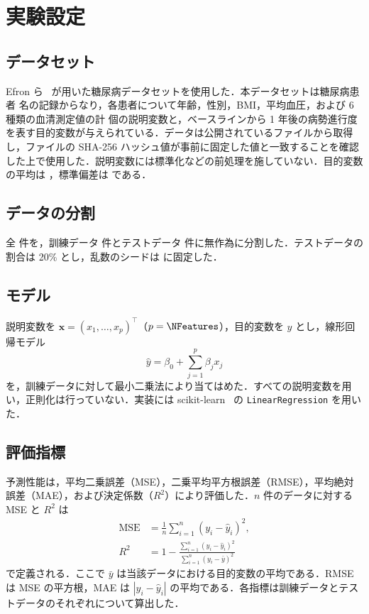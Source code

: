 \documentclass[9pt,a4paper,twocolumn]{ltjsarticle}
\begin{document}

\section{実験設定}

\subsection{データセット}
Efron ら~\cite{efron2004} が用いた糖尿病データセットを使用した．本データセットは糖尿病患者 \NSamples{} 名の記録からなり，各患者について年齢，性別，BMI，平均血圧，および 6 種類の血清測定値の計 \NFeatures{} 個の説明変数と，ベースラインから 1 年後の病勢進行度を表す目的変数が与えられている．データは公開されているファイルから取得し，ファイルの SHA-256 ハッシュ値が事前に固定した値と一致することを確認した上で使用した．説明変数には標準化などの前処理を施していない．目的変数の平均は \TargetMean{}，標準偏差は \TargetStd{} である．

\subsection{データの分割}
全 \NSamples{} 件を，訓練データ \NTrain{} 件とテストデータ \NTest{} 件に無作為に分割した．テストデータの割合は 20\% とし，乱数のシードは \Seed{} に固定した．

\subsection{モデル}
説明変数を $\boldsymbol{x} = (x_1, \dots, x_p)^\top$（$p = \NFeatures$），目的変数を $y$ とし，線形回帰モデル
\begin{equation}
  \hat{y} = \beta_0 + \sum_{j=1}^{p} \beta_j x_j
  \label{eq:model}
\end{equation}
を，訓練データに対して最小二乗法により当てはめた．すべての説明変数を用い，正則化は行っていない．実装には scikit-learn~\cite{sklearn} の \texttt{LinearRegression} を用いた．

\subsection{評価指標}
予測性能は，平均二乗誤差（MSE），二乗平均平方根誤差（RMSE），平均絶対誤差（MAE），および決定係数（$R^2$）により評価した．$n$ 件のデータに対する MSE と $R^2$ は
\begin{align}
  \mathrm{MSE} &= \frac{1}{n} \sum_{i=1}^{n} (y_i - \hat{y}_i)^2, \\
  R^2 &= 1 - \frac{\sum_{i=1}^{n} (y_i - \hat{y}_i)^2}{\sum_{i=1}^{n} (y_i - \bar{y})^2}
\end{align}
で定義される．ここで $\bar{y}$ は当該データにおける目的変数の平均である．RMSE は MSE の平方根，MAE は $|y_i - \hat{y}_i|$ の平均である．各指標は訓練データとテストデータのそれぞれについて算出した．
\end{document}
